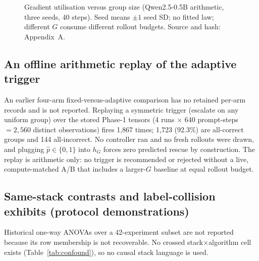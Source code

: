\documentclass[conference]{IEEEtran}
\begin{document}
\begin{figure}[t]
\centering
{}
\caption{Gradient utilisation versus group size (Qwen2.5-0.5B arithmetic,
three seeds, 40 steps). Seed means $\pm1$ seed SD; no fitted law; different
$G$ consume different rollout budgets. Source and hash: Appendix~A.}
\label{fig:gu}
\end{figure}

\subsection{An offline arithmetic replay of the adaptive trigger}
An earlier four-arm fixed-versus-adaptive comparison has no retained per-arm
records and is not reported. Replaying a symmetric trigger (escalate on any
uniform group) over the stored Phase-1 tensors (4 runs $\times$ 640
prompt-steps $=2{,}560$ distinct observations) fires 1,867 times; 1,723
(92.3\%) are all-correct groups and 144 all-incorrect. No controller ran and
no fresh rollouts were drawn, and plugging $\hat p\in\{0,1\}$ into $h_G$
forces zero predicted rescue by construction. The replay is arithmetic
only: no trigger is recommended or rejected without a live, compute-matched
A/B that includes a larger-$G$ baseline at equal rollout budget.

\subsection{Same-stack contrasts and label-collision exhibits
(protocol demonstrations)}
Historical one-way ANOVAs over a 42-experiment subset are not reported
because its row membership is not recoverable. No crossed
stack$\times$algorithm cell exists (Table~\ref{tab:confound}), so no causal
stack language is used.
\end{document}
